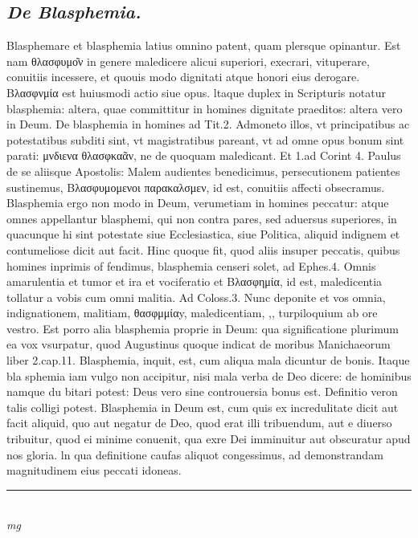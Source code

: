 \documentclass{article}
\begin{document}
\begin{pages}
\subsection*{\textit{De Blasphemia. }}\pstart Blasphemare et blasphemia latius omnino patent, quam plersque  opinantur. Est nam θλασφυμο͂ν in genere maledicere alicui superiori, execrari, vituperare, conuitiis incessere, et quouis modo dignitati atque  honori eius derogare. Βλασφνμία est huiusmodi actio siue opus. ltaque  duplex in Scripturis notatur blasphemia: altera, quae committitur in homines dignitate praeditos: altera vero in Deum. De blasphemia in homines ad Tit.2. Admoneto illos, vt principatibus ac potestatibus subditi sint, vt magistratibus pareant, vt ad omne opus bonum sint parati: μνδιενα θλασφκαᾶν, ne de quoquam maledicant. Et 1.ad Corint 4. Paulus de se aliisque  Apostolis: Malem audientes benedicimus, persecutionem patientes sustinemus, Βλασφυμομενοι παρακαλσμεν, id est, conuitiis affecti obsecramus. Blasphemia ergo non modo in Deum, verumetiam in homines peccatur: atque  omnes appellantur blasphemi, qui non contra pares, sed aduersus superiores, in quacunque  hi sint potestate siue Ecclesiastica, siue Politica, aliquid indignem et contumeliose dicit aut facit. Hinc quoque  fit, quod aliis insuper peccatis, quibus homines inprimis of fendimus, blasphemia censeri solet, ad Ephes.4. Omnis amarulentia et tumor et ira et   vociferatio et Βλασφημία, id est, maledicentia tollatur a vobis cum omni malitia. Ad Coloss.3. Nunc deponite et vos omnia, indignationem, malitiam, θασφμμίαy, maledicentiam, ,, turpiloquium ab ore vestro. Est porro alia blasphemia proprie in Deum: qua significatione plurimum ea vox vsurpatur, quod Augustinus quoque  indicat de moribus Manichaeorum liber 2.cap.11. Blasphemia, inquit, est, cum aliqua mala dicuntur de bonis. Itaque  bla   sphemia iam vulgo non accipitur, nisi mala verba de Deo dicere: de hominibus namque  du bitari potest: Deus vero sine controuersia bonus est. Definitio veron talis colligi potest. Blasphemia in Deum est, cum quis ex incredulitate dicit aut facit aliquid, quo aut negatur de Deo, quod erat illi tribuendum, aut e diuerso tribuitur, quod ei minime conuenit, qua exre Dei imminuitur aut obscuratur apud nos gloria. ln qua definitione caufas aliquot congessimus, ad demonstrandam magnitudinem eius peccati idoneas.  \pend
\vspace{0.5cm}\noindent
\vspace{0.2cm}\rule{1cm}{0.2pt}\\ 
\hspace{0.2cm}\textit{mg}

\end{pages}
\end{document}
